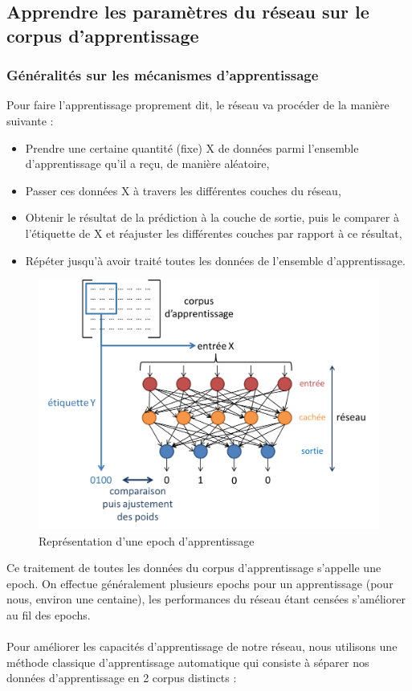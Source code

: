 \documentclass{article}
\begin{document}
\subsection{Apprendre les paramètres du réseau sur le corpus d'apprentissage}

\subsubsection{Généralités sur les mécanismes d'apprentissage}

Pour faire l'apprentissage proprement dit, le réseau va procéder de la manière suivante :
\begin{itemize}
  \item Prendre une certaine quantité (fixe) X de données parmi l'ensemble d'apprentissage qu'il a reçu, de manière aléatoire,
  \item Passer ces données X à travers les différentes couches du réseau,
  \item Obtenir le résultat de la prédiction à la couche de sortie, puis le comparer à l'étiquette de X et réajuster les différentes couches par rapport à ce résultat,
  \item Répéter jusqu'à avoir traité toutes les données de l'ensemble d'apprentissage.
\end{itemize}

\hphantom{.}
\begin{figure}[h]
  \centerline{\includegraphics[scale=0.6]{img/schema_epoch.png}}
  \caption{Représentation d'une epoch d'apprentissage}
\end{figure}

\noindent Ce traitement de toutes les données du corpus d'apprentissage s'appelle une epoch. On effectue généralement plusieurs epochs pour un apprentissage (pour nous, environ une centaine), les performances du réseau étant censées s'améliorer au fil des epochs. \\
 \\
Pour améliorer les capacités d'apprentissage de notre réseau, nous utilisons une méthode classique d'apprentissage automatique qui consiste à séparer nos données d'apprentissage en 2 corpus distincts : 
\end{document}

